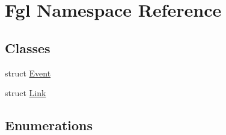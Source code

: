 \hypertarget{namespaceFgl}{
\section{Fgl Namespace Reference}
\label{namespaceFgl}
}
\subsection*{Classes}
\begin{DoxyCompactItemize}
\item 
struct \hyperlink{structFgl_1_1Event}{Event}
\item 
struct \hyperlink{structFgl_1_1Link}{Link}
\end{DoxyCompactItemize}
\subsection*{Enumerations}
